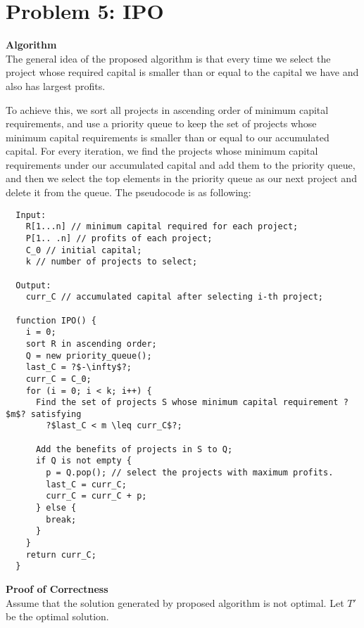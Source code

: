 \documentclass{article}
\newcommand{\Proof}{\vspace{0.3cm} \noindent\textbf{Proof of Correctness} \vspace{0.2cm} \\}
\newcommand{\Algorithm}{\textbf{Algorithm} \vspace{0.2cm}\\}
\begin{document}
\section*{Problem 5: IPO}

\Algorithm
The general idea of the proposed algorithm is that every time we select the project whose required
capital is smaller than or equal to the capital we have and also has largest profits. 

To achieve this, we sort all projects in ascending order of minimum capital requirements, and use a
priority queue to keep the set of projects whose minimum capital requirements is smaller than or
equal to our accumulated capital. For every iteration, we find the projects whose minimum capital
requirements under our accumulated capital and add them to the priority queue, and then we select the
top elements in the priority queue as our next project and delete it from the queue. The pseudocode is as following:

\begin{verbatim}
  Input:
    R[1...n] // minimum capital required for each project;
    P[1.. .n] // profits of each project;
    C_0 // initial capital;
    k // number of projects to select;
  
  Output:
    curr_C // accumulated capital after selecting i-th project;

  function IPO() {
    i = 0;
    sort R in ascending order;
    Q = new priority_queue();  
    last_C = ?$-\infty$?;
    curr_C = C_0;
    for (i = 0; i < k; i++) {
      Find the set of projects S whose minimum capital requirement ?$m$? satisfying 
        ?$last_C < m \leq curr_C$?;      
      
      Add the benefits of projects in S to Q;
      if Q is not empty {
        p = Q.pop(); // select the projects with maximum profits.
        last_C = curr_C;
        curr_C = curr_C + p; 
      } else {
        break;
      }
    }
    return curr_C;
  }
\end{verbatim}


\Proof
Assume that the solution generated by proposed algorithm is not optimal. Let $T'$ be the optimal
solution.
\end{document}
